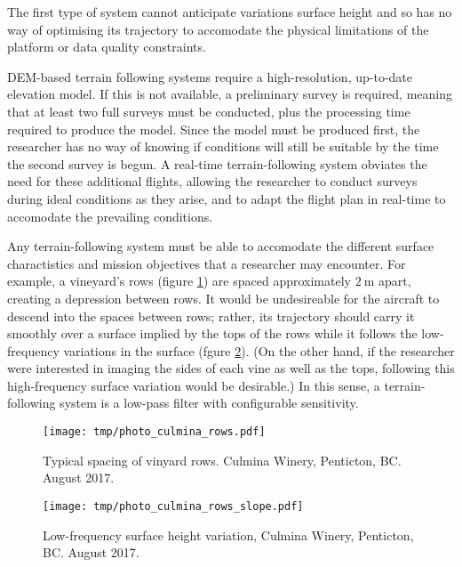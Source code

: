 \documentclass[doc]{apa6}
\begin{document}
The first type of system cannot anticipate variations surface height and so has no way of optimising its trajectory to accomodate the physical limitations of the platform or data quality constraints. 

DEM-based terrain following systems require a high-resolution, up-to-date elevation model. If this is not available, a preliminary survey is required, meaning that at least two full surveys must be conducted, plus the processing time required to produce the model. Since the model must be produced first, the researcher has no way of knowing if conditions will still be suitable by the time the second survey is begun. A real-time terrain-following system obviates the need for these additional flights, allowing the researcher to conduct surveys during ideal conditions as they arise, and to adapt the flight plan in real-time to accomodate the prevailing conditions.

Any terrain-following system must be able to accomodate the different surface charactistics and mission objectives that a researcher may encounter. For example, a vineyard's rows (figure \ref{fig:photo_culmina_rows}) are spaced approximately $\SI{2}\m$ apart, creating a depression between rows. It would be undesireable for the aircraft to descend into the spaces between rows; rather, its trajectory should carry it smoothly over a surface implied by the tops of the rows while it follows the low-frequency variations in the surface (fgure \ref{fig:photo_culmina_rows_slope}). (On the other hand, if the researcher were interested in imaging the sides of each vine as well as the tops, following this high-frequency surface variation would be desirable.) In this sense, a terrain-following system is a low-pass filter with configurable sensitivity. 

\begin{figure} %
\texttt{[image: tmp/photo\_culmina\_rows.pdf]} 
\caption{Typical spacing of vinyard rows. Culmina Winery, Penticton, BC. August 2017.}
\label{fig:photo_culmina_rows}
\end{figure}

\begin{figure} %
\texttt{[image: tmp/photo\_culmina\_rows\_slope.pdf]} 
\caption{Low-frequency surface height variation, Culmina Winery, Penticton, BC. August 2017.}
\label{fig:photo_culmina_rows_slope}
\end{figure}
\end{document}
